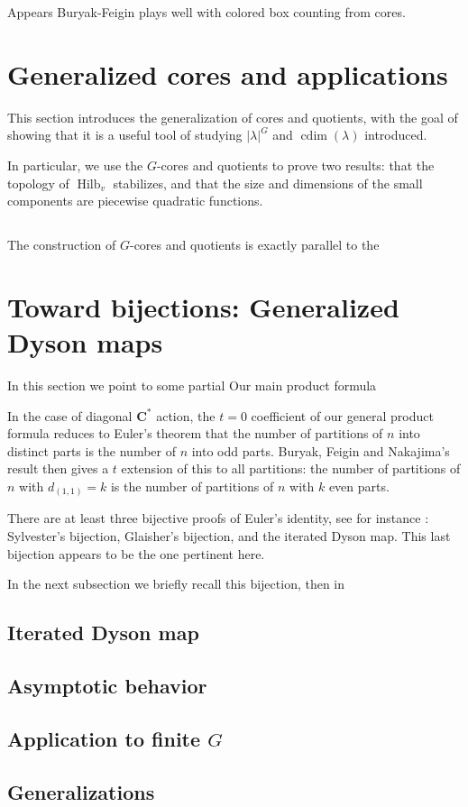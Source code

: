 \documentclass{amsart}[12pt]
\theoremstyle{definition}
\newcommand{\C}{\mathbf{C}}
\DeclareMathOperator{\Hilb}{Hilb}
\DeclareMathOperator{\cdim}{cdim}
\begin{document}
Appears Buryak-Feigin plays well with colored box counting from cores.



\section{Generalized cores and applications}

This section introduces the generalization of cores and quotients, with the goal of showing that it is a useful tool of studying $|\lambda|^G$ and $\cdim(\lambda)$ introduced.

In particular, we use the $G$-cores and quotients to prove two results: that the topology of $\Hilb_v$ stabilizes, and that the size and dimensions of the small components are piecewise quadratic functions.

\subsection{ }

The construction of $G$-cores and quotients is exactly parallel to the 







\section{Toward bijections: Generalized Dyson maps} \label{sec:dyson}

In this section we point to some partial Our main product formula 

In the case of diagonal $\C^*$ action, the $t=0$ coefficient of our general product formula reduces to Euler's theorem that the number of partitions of $n$ into distinct parts is the number of $n$ into odd parts.  Buryak, Feigin and Nakajima's result then gives a $t$ extension of this to all partitions: the number of partitions of $n$ with $d_{(1,1)}=k$ is the number of partitions of $n$ with $k$ even parts.

There are at least three bijective proofs of Euler's identity, see for instance \cite{pak}: Sylvester's bijection, Glaisher's bijection, and the iterated Dyson map.  This last bijection appears to be the one pertinent here.

In the next subsection we briefly recall this bijection, then in 
\subsection{Iterated Dyson map} \label{sec:review-dyson}


\subsection{Asymptotic behavior} \label{sec-asymptotic-dyson}

\subsection{Application to finite \texorpdfstring{$G$}{G}} 


\subsection{Generalizations} \label{sec:generalized-dyson}






\end{document}
